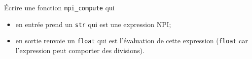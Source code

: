 \documentclass[10pt,cours,firamath,a4paper]{nsi}
\begin{document}
\begin{exercice}
\'Ecrire une fonction \texttt{mpi_compute} qui
\begin{itemize}
	\item 	en entrée prend un \texttt{str} qui est une expression NPI;
	\item 	en sortie renvoie un \texttt{float} qui est l'évaluation de cette expression (\texttt{float} car l'expression peut comporter des divisions).	
\end{itemize}
\end{exercice}
\end{document}

